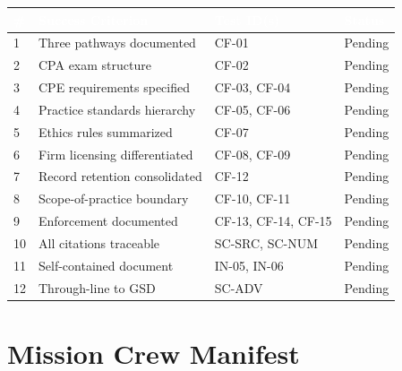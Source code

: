 \documentclass[11pt,letterpaper]{article}
\newcommand{\tableheader}[1]{\textbf{\sffamily\textcolor{white}{#1}}}
\begin{document}
\begin{center}
\begin{tabularx}{\textwidth}{C{0.5cm}XL{3cm}C{1.5cm}}
\toprule
{}
\tableheader{\#} & \tableheader{Success Criterion} & \tableheader{Test ID(s)} & \tableheader{Status} \\
 & Three pathways documented & CF-01 & Pending \\
2 & CPA exam structure & CF-02 & Pending \\
3 & CPE requirements specified & CF-03, CF-04 & Pending \\
4 & Practice standards hierarchy & CF-05, CF-06 & Pending \\
5 & Ethics rules summarized & CF-07 & Pending \\
6 & Firm licensing differentiated & CF-08, CF-09 & Pending \\
7 & Record retention consolidated & CF-12 & Pending \\
8 & Scope-of-practice boundary & CF-10, CF-11 & Pending \\
9 & Enforcement documented & CF-13, CF-14, CF-15 & Pending \\
10 & All citations traceable & SC-SRC, SC-NUM & Pending \\
11 & Self-contained document & IN-05, IN-06 & Pending \\
12 & Through-line to GSD & SC-ADV & Pending \\
\bottomrule
\end{tabularx}
\end{center}

\section{Mission Crew Manifest}
\end{document}
